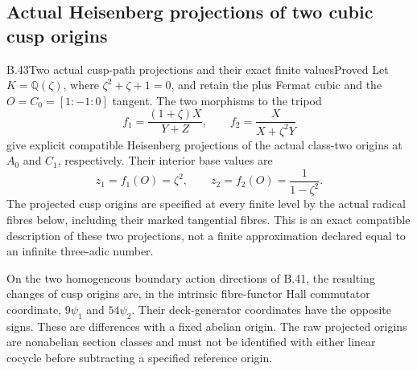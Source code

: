 \subsection{Actual Heisenberg projections of two cubic cusp origins}

\begin{statement}{B.43}{Two actual cusp-path projections and their exact finite values}{Proved}
Let $K=\mathbb Q(\zeta)$, where $\zeta^2+\zeta+1=0$, and retain
the plus Fermat cubic and the $O=C_0=[1:-1:0]$ tangent.
The two morphisms to the tripod
\[
 f_1=\frac{(1+\zeta)X}{Y+Z},\qquad
 f_2=\frac{X}{X+\zeta^2Y}                                  \tag{B.43.1}
\]
give explicit compatible Heisenberg projections of the
actual class-two origins at $A_0$ and $C_1$, respectively.
Their interior base values are
\[
 z_1=f_1(O)=\zeta^2,\qquad
 z_2=f_2(O)=\frac1{1-\zeta^2}.                              \tag{B.43.2}
\]
The projected cusp origins are specified at every finite
level by the actual radical fibres below, including their
marked tangential fibres.  This is an exact compatible
description of these two projections, not a finite
approximation declared equal to an infinite three-adic number.

On the two homogeneous boundary action directions of B.41,
the resulting changes of cusp origins are, in the intrinsic
fibre-functor Hall commutator coordinate, $9\psi_1$ and
$54\psi_2$. Their deck-generator coordinates have the opposite signs.
These are differences with a fixed abelian origin.  The
raw projected origins are nonabelian section classes and
must not be identified with either linear cocycle before
subtracting a specified reference origin.
\end{statement}
